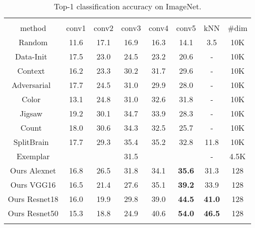 \begin{table}[tp]
\setlength{\tabcolsep}{1.1pt}
\centering
\begin{tabular}{c|ccccc|c|c}
\Xhline{2\arrayrulewidth}
  \multicolumn{8}{c}{Image Classification Accuracy on ImageNet} \\
\Xhline{2\arrayrulewidth}
method  & conv1 & conv2 & conv3 & conv4 & conv5 & kNN & \#dim \\
\hline
Random & 11.6 & 17.1 & 16.9 & 16.3 & 14.1 & 3.5 & 10K \\
Data-Init~\cite{krahenbuhl2015data} & 17.5 & 23.0 & 24.5 & 23.2 & 20.6 & - & 10K\\
Context~\cite{doersch2015unsupervised} & 16.2 & 23.3 & 30.2 & 31.7 & 29.6 & - & 10K\\
Adversarial~\cite{donahue2016adversarial} & 17.7 & 24.5 & 31.0 & 29.9 & 28.0 & - & 10K\\
Color~\cite{zhang2016colorful} & 13.1 & 24.8 & 31.0 & 32.6 & 31.8 & - & 10K\\
Jigsaw~\cite{noroozi2016unsupervised} & 19.2 & 30.1 & 34.7 & 33.9 & 28.3 & - & 10K\\
Count~\cite{noroozi2017representation} & 18.0 & 30.6 & 34.3 & 32.5 & 25.7 & - & 10K \\
SplitBrain~\cite{zhang2017split} & 17.7 & 29.3 & 35.4 & 35.2 & 32.8 & 11.8 & 10K\\
\Xhline{2\arrayrulewidth}
Exemplar\cite{doersch2017multi} & & & 31.5 & & & - & 4.5K \\
\Xhline{2\arrayrulewidth}
Ours Alexnet & 16.8 & 26.5 & 31.8 & 34.1 & \textbf{35.6} & 31.3 & 128 \\
Ours VGG16 & 16.5 & 21.4 & 27.6 & 35.1 & \textbf{39.2} & 33.9 & 128 \\
Ours Resnet18 & 16.0 & 19.9 & 29.8 & 39.0 & \textbf{44.5} & \textbf{41.0} & 128\\
Ours Resnet50 & 15.3 & 18.8 & 24.9 & 40.6 & \textbf{54.0} & \textbf{46.5} & 128\\
\Xhline{2\arrayrulewidth}
\end{tabular}
\caption{\small
    Top-1 classification accuracy on ImageNet.
}
\label{exp:cls_imagenet}
\end{table}

